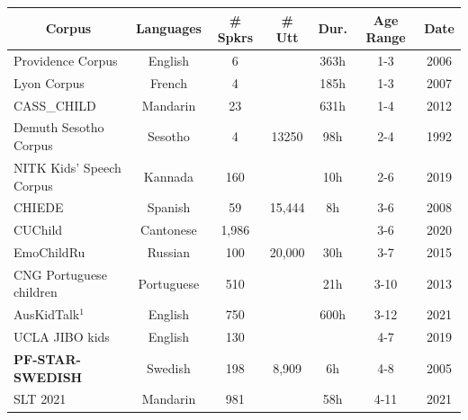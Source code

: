 

\begin{table}
\small
\begin{tabular}{l|c|c|c|c|c|c} 
\hline
\multicolumn{1}{c|}{\textbf{Corpus}} & \multicolumn{1}{c|}{\textbf{Languages}} & \multicolumn{1}{c|}{\textbf{\# Spkrs}} & \multicolumn{1}{c|}{\textbf{\# Utt}} & \multicolumn{1}{c|}{\textbf{Dur.}} & \multicolumn{1}{c|}{\textbf{Age Range}} & \multicolumn{1}{c}{\textbf{Date}} \\ 
\hline
Providence Corpus \cite{providence} & English & 6 &  & 363h & 1-3 & 2006 \\ 
\hline
Lyon Corpus \cite{LyonSC} & French & 4 &  & 185h & 1-3 & 2007 \\ 
\hline
CASS\_CHILD \cite{cass_child} & Mandarin & 23 &  & 631h & 1-4 & 2012 \\ 
\hline
Demuth Sesotho Corpus \cite{demuth1992acquisition} & Sesotho & 4 & 13250 & 98h & 2-4 & 1992 \\ 
\hline
NITK Kids’ Speech Corpus \cite{nitk} & Kannada & 160 &  & 10h & 2-6 & 2019 \\ 
\hline
CHIEDE \cite{chiede} & Spanish & 59 & 15,444 & 8h & 3-6 & 2008 \\ 
\hline
CUChild \cite{cuchild} & Cantonese & 1,986 &  &  & 3-6 & 2020 \\ 
\hline
EmoChildRu \cite{emochildru} & Russian & 100 & 20,000 & 30h & 3-7 & 2015 \\ 
\hline
CNG Portuguese children\cite{hamalainen2013cng} & Portuguese & 510 &  & 21h & 3-10 & 2013 \\ 
\hline
AusKidTalk$^1$ \cite{ahmed2021auskidtalk} & English & 750 &  & 600h & 3-12 & 2021 \\ 
\hline
UCLA JIBO kids \cite{yeung2019robotic} & English & 130 &  &  & 4-7 & 2019 \\ 
\hline
\textbf{PF-STAR-SWEDISH} \cite{pfstar}
& Swedish & 198 & 8,909 & 6h & 4-8 & 2005 \\ 
\hline
SLT 2021 \cite{yu2021slt} & Mandarin & 981 &  & 58h & 4-11 & 2021 \\ 

\end{tabular}
\end{table}
